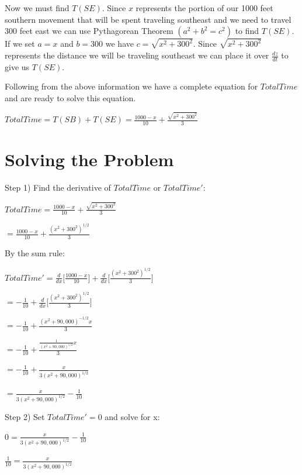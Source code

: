 \documentclass{article}
\begin{document}
Now we must find $ T(SE) $. Since $ x $ represents the portion of our 1000 feet southern movement that will be spent traveling southeast and we need to travel 300 feet east we can use Pythagorean Theorem $ (a^2 + b^2 = c^2) $ to find $ T(SE) $. If we set $ a = x $ and $ b = 300 $ we have $ c = \sqrt{x^2 + 300^2} $. Since $ \sqrt{x^2 + 300^2} $ represents the distance we will be traveling southeast we can place it over $ \frac{dz}{dt} $ to give us $ T(SE) $.

\vspace{.5cm}
Following from the above information we have a complete equation for $ TotalTime $ and are ready to solve this equation.

\vspace{.25cm}
$ TotalTime = T(SB) + T(SE) = \frac{1000 - x}{10} + \frac{\sqrt{x^2 + 300^2}}{3} $

\section{Solving the Problem}

Step 1) Find the derivative of $ TotalTime $ or $ TotalTime' $:

\vspace{.5cm}
$ TotalTime = \frac{1000 - x}{10} + \frac{\sqrt{x^2 + 300^2}}{3} $

$= \frac{1000 - x}{10} + \frac{(x^2 + 300^2)^{1/2}}{3} $

\vspace{.5cm}
By the sum rule:

$TotalTime' = \frac{d}{dx} \big[ \frac{1000 - x}{10} \big] + \frac{d}{dx} \big[ \frac{(x^2 + 300^2)^{1/2}}{3} \big] $

$= -\frac{1}{10} + \frac{d}{dx} \big[ \frac{(x^2 + 300^2)^{1/2}}{3} \big] $

$= -\frac{1}{10} + \frac{(x^2 + 90,000)^{-1/2}x}{3} $

$= -\frac{1}{10} + \frac{\frac{1}{ (x^2 + 90,000)^{1/2} }x}{3} $

$= -\frac{1}{10} + \frac{x}{3(x^2 + 90,000)^{1/2}} $

$= \frac{x}{3(x^2 + 90,000)^{1/2}} -\frac{1}{10} $

\vspace{.5cm}
Step 2) Set  $ TotalTime' = 0 $ and solve for x:

$ 0 = \frac{x}{3(x^2 + 90,000)^{1/2}} -\frac{1}{10} $

$ \frac{1}{10} = \frac{x}{3(x^2 + 90,000)^{1/2}} $
\end{document}
